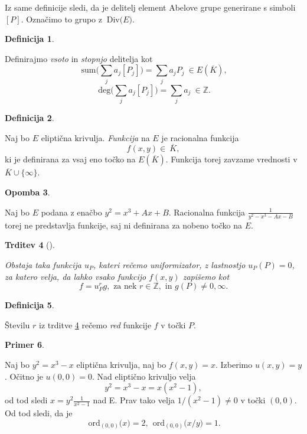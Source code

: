 \documentclass[12pt,a4paper,twoside]{article}
\theoremstyle{definition} %
\newtheorem{definicija}{Definicija}[section]
\newtheorem{primer}[definicija]{Primer}
\newtheorem{opomba}[definicija]{Opomba}
\theoremstyle{plain} %
\newtheorem{trditev}[definicija]{Trditev}
\numberwithin{equation}{section}  %
\newcommand{\Z}{\mathbb Z}
\newcommand{\E}[1]{E({#1})}
\newcommand{\DIV}[1]{\ \text{Div(}{#1}\text{)}}
\newcommand{\DEG}[1]{\ \text{deg(}{#1}\text{)}}
\newcommand{\SUM}[1]{\ \text{sum(}{#1}\text{)}}
\newcommand{\ORDp}[2]{\ \text{ord}_{#2}({#1}\text{)}}
\begin{document}
Iz same definicije sledi, da je delitelj element Abelove grupe generirane s simboli $[P]$. Označimo to grupo z $\DIV{E}$.


\begin{definicija}~

Definirajmo \emph{vsoto} in \emph{stopnjo} delitelja kot
$$\SUM{\sum_{j}a_j[P_j]} = \sum_ja_jP_j \ \in \E{\overline{K}},$$
$$\DEG{\sum_{j}a_j[P_j]} = \sum_ja_j \ \in \Z.$$

\end{definicija}


\begin{definicija}~

Naj bo $E$ eliptična krivulja. \emph{Funkcija} na $E$ je racionalna funkcija $$f(x,y) \in \ \overline{K},$$ ki je definirana za vsaj eno točko na $\E{\overline{K}}$. Funkcija torej zavzame vrednosti v $\overline{K} \cup \{ \infty \}$.
\end{definicija}

\begin{opomba}~

Naj bo $E$ podana z enačbo $y^2 = x^3+Ax+B$. Racionalna funkcija $\frac{1}{y^2-x^3-Ax-B}$ torej ne predstavlja funkcije, saj ni definirana za nobeno točko na $E$.

\end{opomba}

\begin{trditev}[]~
\label{trd:red}

Obstaja taka funkcija $u_P$, kateri rečemo uniformizator,  z lastnostjo $u_P(P) = 0$, za katero velja, da lahko vsako funkcijo $f(x,y)$ zapišemo kot
$$f = u^r_Pg, \text{ za nek } r\in \Z,\text{ in } g(P) \neq 0,\infty.$$
\end{trditev}

\begin{definicija}~

Številu $r$ iz trditve \ref{trd:red} rečemo \emph{red} funkcije $f$ v točki $P$.
\end{definicija}

\begin{primer}~

Naj bo $y^2 = x^3-x$ eliptična krivulja, naj bo $f(x,y) = x$. Izberimo $u(x,y) = y$. Očitno je $u(0,0) = 0$. Nad eliptično krivuljo velja 
$$y^2 = x^3-x = x(x^2-1),$$ 
od tod sledi $x = y^2\frac{1}{x^2-1}$ nad E.
Prav tako velja $1/(x^2-1) \neq 0$ v točki $(0,0)$. Od tod sledi, da je 
$$\ORDp{x}{(0,0)} = 2,\  \ORDp{x/y}{(0,0)}= 1.$$
\end{primer}
\end{document}
